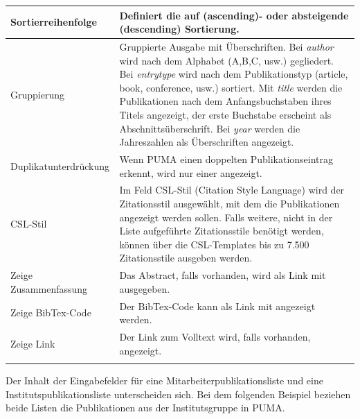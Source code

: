 \begin{longtabu}{|X|p{7cm}|}
Sortierreihenfolge &	Definiert die auf (ascending)- oder absteigende (descending) Sortierung.\\ \hline 
Gruppierung &	Gruppierte Ausgabe mit Überschriften. Bei \textit{author} wird nach dem Alphabet (A,B,C, usw.) gegliedert. Bei \textit{entrytype} wird nach dem Publikationstyp (article, book, conference, usw.) sortiert. Mit \textit{title} werden die Publikationen nach dem Anfangsbuchstaben ihres Titels angezeigt, der erste Buchstabe erscheint als Abschnittsüberschrift. Bei \textit{year} werden die Jahreszahlen als Überschriften angezeigt.\\ \hline
Duplikatunterdrückung &	Wenn PUMA einen doppelten Publikationseintrag erkennt, wird nur einer angezeigt.\\ \hline
CSL-Stil &	Im Feld CSL-Stil (Citation Style Language) wird der Zitationsstil ausgewählt, mit dem die Publikationen angezeigt werden sollen. Falls weitere, nicht in der Liste aufgeführte Zitationsstile benötigt werden, können über die CSL-Templates bis zu 7.500 Zitationsstile ausgeben werden.\\ \hline
Zeige Zusammenfassung& 	Das Abstract, falls vorhanden, wird als Link mit ausgegeben.\\ \hline
Zeige BibTex-Code &	Der BibTex-Code kann als Link mit angezeigt werden.\\ \hline
Zeige Link & Der Link zum Volltext wird, falls vorhanden, angezeigt.\\ \hline
\label{tab:eingabefelder}
\end{longtabu}
Der Inhalt der Eingabefelder für eine Mitarbeiterpublikationsliste und eine Institutspublikationsliste unterscheiden sich. Bei dem folgenden Beispiel beziehen beide Listen die Publikationen aus der Institutsgruppe in PUMA.\newline\newline
